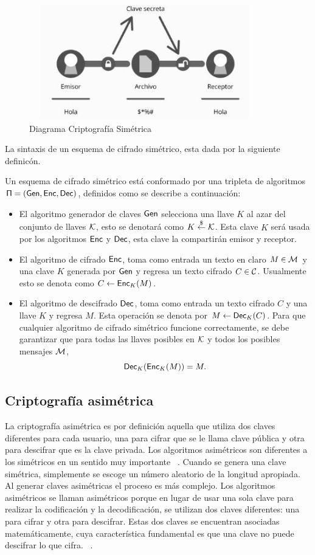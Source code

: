 \begin{figure}[H]
\centering
	\includegraphics[width=10cm, height=5cm]{./images/Cripto_Simetrica.jpg}
	\caption{Diagrama Criptografía Simétrica}
	\label{fig:1-2-1}
\end{figure}
La sintaxis de un esquema de cifrado sim\'etrico, esta dada por la siguiente definic\'on.
\begin{definition} 
Un esquema de cifrado sim\'etrico est\'a conformado por una tripleta de algoritmos 
$\sf \Pi=(Gen, Enc, Dec)$, definidos como se describe a continuaci\'on:
\begin{itemize}
\item  El algoritmo generador de claves $\sf Gen$ selecciona una llave  $K$ al azar del conjunto de llaves $\cal K$, esto se denotar\'a como $K \stackrel{\$}\leftarrow {\cal K}$.
Esta clave $K$  ser\'a usada por los algoritmos  $\sf Enc$ y $\sf Dec$, esta clave la compartir\'an  emisor y receptor. 
\item El algoritmo de cifrado $\sf Enc$, toma como entrada un texto en claro  $M \in {\cal M}$ y una clave $K$ generada por  $\sf Gen$  y regresa un texto cifrado $C \in {\cal C}$.  Usualmente esto se denota como $C \leftarrow {\sf Enc}_K(M)$.
 \item El algoritmo de descifrado $\sf Dec$, toma como entrada un texto cifrado $C$ y una llave $K$ y regresa $M$. Esta operaci\'on se denota por  $M \leftarrow {\sf Dec}_K(C)$.
Para que cualquier algoritmo de cifrado sim\'etrico funcione correctamente, se debe garantizar que para
todas las llaves posibles en  $\cal K$ y todos los posibles mensajes $\cal M$, $$ {\sf Dec}_K({\sf Enc}_K(M)) = M.$$
\end{itemize}
\end{definition}

\subsection{Criptografía asimétrica}
La criptografía asimétrica es por definición aquella que utiliza dos claves diferentes para cada usuario, una para cifrar que se le llama clave pública y otra para descifrar que es la clave privada. Los algoritmos asimétricos son diferentes a los simétricos en un sentido muy importante ~\cite{sime}. Cuando se genera una clave simétrica, simplemente se escoge un número aleatorio de la longitud apropiada. Al generar claves asimétricas el proceso es más complejo. Los algoritmos asimétricos se llaman asimétricos porque en lugar de usar una sola clave para realizar la codificación y la decodificación, se utilizan dos claves diferentes: una para cifrar y otra para descifrar. Estas dos claves se encuentran asociadas matemáticamente, cuya característica fundamental es que una clave no puede descifrar lo que cifra. ~\cite{sime}.

